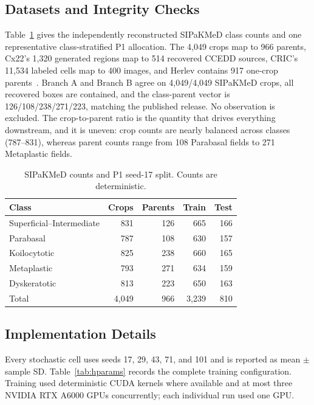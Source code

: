\documentclass[conference]{IEEEtran}
\newcommand{\protocol}[1]{\textsf{#1}}
\begin{document}
\subsection{Datasets and Integrity Checks}
Table~\ref{tab:classes} gives the independently reconstructed SIPaKMeD class counts and one representative class-stratified \protocol{P1} allocation.
The 4,049 crops map to 966 parents, Cx22's 1,320 generated regions map to 514 recovered CCEDD sources, CRIC's 11,534 labeled cells map to 400 images, and Herlev contains 917 one-crop parents~\cite{plissiti2018sipakmed,liu2022cx22,rezende2021cric,jantzen2005pap}.
Branch A and Branch B agree on 4,049/4,049 SIPaKMeD crops, all recovered boxes are contained, and the class-parent vector is 126/108/238/271/223, matching the published release.
No observation is excluded.
The crop-to-parent ratio is the quantity that drives everything downstream, and it is uneven: crop counts are nearly balanced across classes (787--831), whereas parent counts range from 108 Parabasal fields to 271 Metaplastic fields.

\begin{table}[t]
\caption{SIPaKMeD counts and \protocol{P1} seed-17 split. Counts are deterministic.}
\label{tab:classes}
\centering
\scriptsize
\setlength{\tabcolsep}{4.0pt}
\begin{tabular}{lrrrr}
\toprule
Class & Crops & Parents & Train & Test \\
\midrule
Superficial--Intermediate & 831 & 126 & 665 & 166 \\
Parabasal & 787 & 108 & 630 & 157 \\
Koilocytotic & 825 & 238 & 660 & 165 \\
Metaplastic & 793 & 271 & 634 & 159 \\
Dyskeratotic & 813 & 223 & 650 & 163 \\
\midrule
Total & 4,049 & 966 & 3,239 & 810 \\
\bottomrule
\end{tabular}
\end{table}

\subsection{Implementation Details}
Every stochastic cell uses seeds 17, 29, 43, 71, and 101 and is reported as mean $\pm$ sample SD.
Table~\ref{tab:hparams} records the complete training configuration.
Training used deterministic CUDA kernels where available and at most three NVIDIA RTX A6000 GPUs concurrently; each individual run used one GPU.
\end{document}
